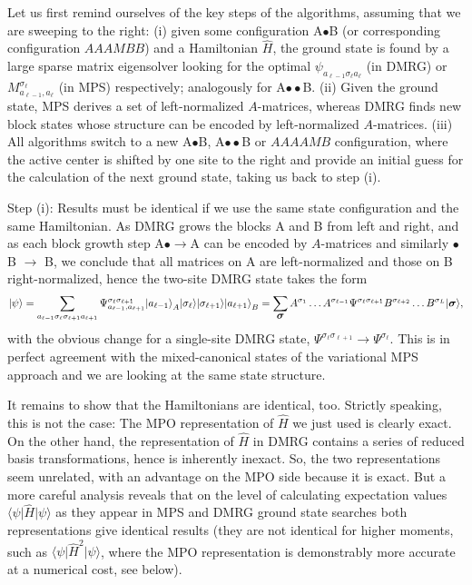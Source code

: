 \documentclass[a4paper,10pt,oneside,onecolumn,1p,times]{elsarticle}
\newcommand{\bra}[1]{\mbox{$\langle #1  |$}}
\newcommand{\ket}[1]{\mbox{$| #1  \rangle$}}
\newcommand{\fat}[1]{\mbox{\boldmath$#1$\unboldmath}}	%
\begin{document}
Let us first remind ourselves of the key steps of the algorithms, assuming that we are sweeping to the right: (i) given some configuration A$\bullet$B (or corresponding configuration $AAAMBB$) and a Hamiltonian $\hat{H}$, the ground state is found by a large sparse matrix eigensolver looking for the optimal $\psi_{a_{\ell-1} \sigma_\ell a_\ell}$ (in DMRG) or $M^{\sigma_\ell}_{a_{\ell-1}, a_\ell}$ (in MPS) respectively; analogously for A$\bullet\bullet$B. (ii) Given the ground state, MPS derives a set of left-normalized $A$-matrices, whereas DMRG finds new block states whose structure can be encoded by left-normalized $A$-matrices. (iii) All algorithms switch to a new A$\bullet$B, A$\bullet\bullet$B or $AAAAMB$ configuration, where the active center is shifted by one site to the right and provide an initial guess for the calculation of the next ground state, taking us back to step (i).

Step (i): Results must be identical if we use the same state configuration and the same Hamiltonian. As DMRG grows the blocks A and B from left and right, and as each block growth step A$\bullet \rightarrow$A can be encoded by $A$-matrices and similarly $\bullet$B $\rightarrow$ B, we conclude that all matrices on A are left-normalized and those on B right-normalized, hence the two-site DMRG state takes the form
\begin{equation}
\ket{\psi} = \sum_{a_{\ell-1} \sigma_\ell \sigma_{\ell+1} a_{\ell+1}} \Psi^{\sigma_\ell\sigma_{\ell+1}}_{a_{\ell-1}, a_{\ell+1}} \ket{a_{\ell-1}}_A \ket{\sigma_\ell} \ket{\sigma_{\ell+1}} \ket{a_{\ell+1}}_B = \sum_{\fat{\sigma}} A^{\sigma_1} \ldots A^{\sigma_{\ell-1}} 
\Psi^{\sigma_\ell \sigma_{\ell+1}} B^{\sigma_{\ell+2}} \ldots B^{\sigma_L} \ket{\fat{\sigma}},
\end{equation}
with the obvious change for a single-site DMRG state, $\Psi^{\sigma_\ell\sigma_{\ell+1}} \rightarrow \Psi^{\sigma_\ell}$. This is in perfect agreement with the mixed-canonical states of the variational MPS approach and we are looking at the same state structure. 

It remains to show that the Hamiltonians are identical, too. Strictly speaking, this is not the case: 
The MPO representation of $\hat{H}$ we just used is clearly exact. On the other hand, the representation of $\hat{H}$ in DMRG contains a series of reduced basis transformations, hence is inherently inexact. So, the two representations seem unrelated, with an advantage on the MPO side because it is exact. But a more careful analysis reveals that  on the level of calculating expectation values $\bra{\psi} \hat{H} \ket{\psi}$ as they appear in MPS and DMRG ground state searches both representations give identical results (they are not identical for higher moments, such as  $\bra{\psi} \hat{H}^2 \ket{\psi}$, where the MPO representation is demonstrably more accurate at a numerical cost, see below).
\end{document}
